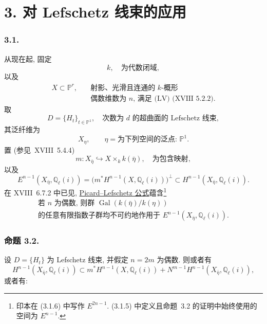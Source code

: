 \section*{3. 对 Lefschetz 线束的应用}

\subsubsection*{3.1.}
从现在起, 固定
\begin{equation}\tag{3.1.0}
k,\quad\text{为代数闭域},
\end{equation}
以及
\begin{equation}\tag{3.1.1}
\begin{aligned}
X\subset\mathbb P^r,\quad
&\text{射影、光滑且连通的 }k\text{-概形}\\
&\text{偶数维数为 }n\text{, 满足 (LV) (XVIII~5.2.2).}
\end{aligned}
\end{equation}
取
\begin{equation}\tag{3.1.2}
D=\{H_t\}_{t\in\mathbb P^1},
\quad\text{次数为 $d$ 的超曲面的 Lefschetz 线束},
\end{equation}
其泛纤维为
\begin{equation}\tag{3.1.3}
X_\eta,\qquad \eta=\text{为下列空间的泛点: }\mathbb P^1.
\end{equation}
置 (参见~XVIII~5.4.4)
\begin{equation}\tag{3.1.4}
m:X_{\bar\eta}\hookrightarrow X\times_k k(\bar\eta),
\quad\text{为包含映射},
\end{equation}
以及
\begin{equation}\tag{3.1.5}
E^{n-1}(X_{\bar\eta},\mathbb Q_\ell(i))
=\bigl(m^*H^{n-1}(X,\mathbb Q_\ell(i))\bigr)^\perp
\subset H^{n-1}(X_{\bar\eta},\mathbb Q_\ell(i)).
\end{equation}
在 XVIII~6.7.2 中已见, \underline{Picard--Lefschetz 公式}蕴含\footnote{印本在 (3.1.6) 中写作 $E^{2n-1}$. (3.1.5) 中定义且命题~3.2 的证明中始终使用的空间为 $E^{n-1}$.}
\begin{equation}\tag{3.1.6}
\begin{gathered}
\text{若 }n\text{ 为偶数, 则群 }
\operatorname{Gal}(k(\bar\eta)/k(\eta))\\
\text{的任意有限指数子群均不可约地作用于 }E^{n-1}(X_{\bar\eta},\mathbb Q_\ell(i)).
\end{gathered}
\end{equation}

\subsubsection*{命题 3.2.}
设 $D=\{H_t\}$ 为 Lefschetz 线束, 并假定 $n=2m$ 为偶数. 则或者有
\begin{equation}\tag{3.2.1}
H^{n-1}(X_{\bar\eta},\mathbb Q_\ell(i))
\subset m^*H^{n-1}(X,\mathbb Q_\ell(i))
+N^{m-1}H^{n-1}(X_{\bar\eta},\mathbb Q_\ell(i)),
\end{equation}
或者有:

